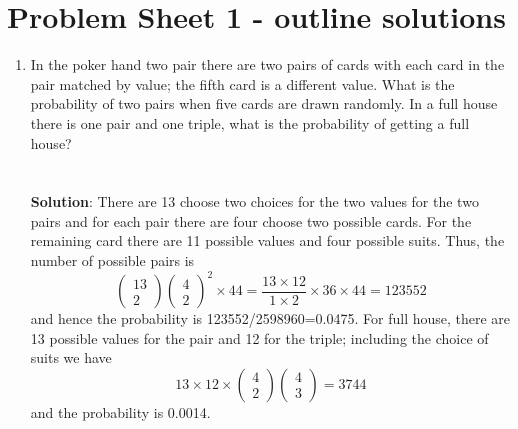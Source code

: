 \documentclass[11pt,a4paper]{scrartcl}
\begin{document}
\section*{Problem Sheet 1 - outline solutions}

\begin{enumerate}

\item In the poker hand two pair there are two pairs of cards with
  each card in the pair matched by value; the fifth card is a
  different value. What is the probability of two pairs when five
  cards are drawn randomly. In a full house there is one pair and one
  triple, what is the probability of getting a full
  house?\\ \\ \\ \textbf{Solution}: There are 13 choose two choices
  for the two values for the two pairs and for each pair there are
  four choose two possible cards. For the remaining card there are 11
  possible values and four possible suits. Thus, the number of
  possible pairs is
\begin{equation}
\left(\begin{array}{c}13\\2\end{array}\right)\left(\begin{array}{c}4\\2\end{array}\right)^2\times 44
=
\frac{13\times 12}{1\times 2}\times 36\times 44=123552
\end{equation}
and hence the probability is 123552/2598960=0.0475. For full house,
there are 13 possible values for the pair and 12 for the triple; including the choice of suits we have
\begin{equation}
13\times 12 \times \left(\begin{array}{c}4\\2\end{array}\right)\left(\begin{array}{c}4\\3\end{array}\right)=3744
\end{equation}
and the probability is 0.0014.


\end{enumerate}
\end{document}
